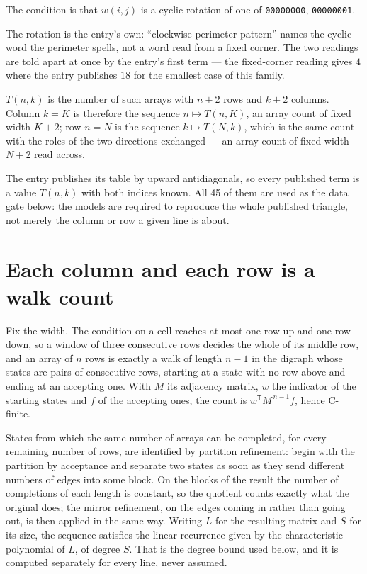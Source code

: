 \documentclass[11pt]{article}
\theoremstyle{definition}
\begin{document}
The condition is that $w(i,j)$ is a cyclic rotation of one of \texttt{00000000}, \texttt{00000001}.

The rotation is the entry's own: ``clockwise perimeter pattern'' names the cyclic word the perimeter spells, not a word read from a fixed corner. The two readings are told apart at once by the entry's first term --- the fixed-corner reading gives $4$ where the entry publishes $18$ for the smallest case of this family.

$T(n,k)$ is the number of such arrays with $n + 2$ rows and $k + 2$ columns. Column $k = K$ is therefore the sequence $n \mapsto T(n,K)$, an array count of fixed width $K + 2$; row $n = N$ is the sequence $k \mapsto T(N,k)$, which is the same count with the roles of the two directions exchanged --- an array count of fixed width $N + 2$ read across.

The entry publishes its table by upward antidiagonals, so every published term is a value $T(n,k)$ with both indices known. All 45 of them are used as the data gate below: the models are required to reproduce the whole published triangle, not merely the column or row a given line is about.

\section{Each column and each row is a walk count}

Fix the width. The condition on a cell reaches at most one row up and one row down, so a window of three consecutive rows decides the whole of its middle row, and an array of $n$ rows is exactly a walk of length $n-1$ in the digraph whose states are pairs of consecutive rows, starting at a state with no row above and ending at an accepting one. With $M$ its adjacency matrix, $w$ the indicator of the starting states and $f$ of the accepting ones, the count is $w^{\mathsf T}M^{\,n-1}f$, hence C-finite.

States from which the same number of arrays can be completed, for every remaining number of rows, are identified by partition refinement: begin with the partition by acceptance and separate two states as soon as they send different numbers of edges into some block. On the blocks of the result the number of completions of each length is constant, so the quotient counts exactly what the original does; the mirror refinement, on the edges coming in rather than going out, is then applied in the same way. Writing $L$ for the resulting matrix and $S$ for its size, the sequence satisfies the linear recurrence given by the characteristic polynomial of $L$, of degree $S$. That is the degree bound used below, and it is computed separately for every line, never assumed.
\end{document}
